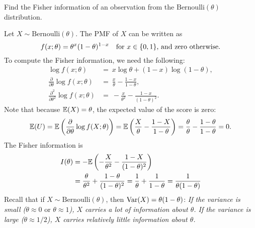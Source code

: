 \begin{example}
Find the Fisher information of an observation from the $\text{Bernoulli}(\theta)$ distribution.
\begin{solution}
Let $X\sim\text{Bernoulli}(\theta)$. The PMF of $X$ can be written as
\[
f(x;\theta)=\theta^x(1-\theta)^{1-x} \text{\quad for $x\in\{0,1\}$, and zero otherwise.}
\]
To compute the Fisher information, we need the following:
\begin{align*}
\log f(x;\theta)
	& = \ x\log\theta + (1-x)\log(1-\theta), \\[2ex]
\frac{\partial}{\partial\theta}\log f(x;\theta)
	& = \ \frac{x}{\theta} - \frac{1-x}{1-\theta}, \\[2ex]
\frac{\partial^2}{\partial\theta^2} \log f(x;\theta)
	& = \ -\frac{x}{\theta^2} - \frac{1-x}{(1-\theta)^2}.
\end{align*}
Note that because $\mathbb{E}(X)=\theta$, the expected value of the score is zero:
\[
\mathbb{E}(U) = \mathbb{E}\left(\frac{\partial}{\partial\theta}\log f(X;\theta)\right) 
	= \mathbb{E}\left(\frac{X}{\theta} - \frac{1-X}{1-\theta}\right)
	= \frac{\theta}{\theta} - \frac{1-\theta}{1-\theta}
	= 0.
\]
The Fisher information is 
\begin{align*}
I(\theta)
	& = -\mathbb{E}\left(-\frac{X}{\theta^2}-\frac{1-X}{(1-\theta)^2}\right) \\
	& = \frac{\theta}{\theta^2}+\frac{1-\theta}{(1-\theta)^2}
	= \frac{1}{\theta}+\frac{1}{1-\theta}
	= \frac{1}{\theta(1-\theta)}
\end{align*}
Recall that if $X\sim\text{Bernoulli}(\theta)$, then $\text{Var}(X)=\theta(1-\theta)$:
\bit
\it If the variance is small ($\theta\approx 0 \text{ or } \theta\approx 1$), $X$ carries a lot of information about $\theta$.
\it If the variance is large ($\theta\approx 1/2$), $X$ carries relatively little information about $\theta$.
\eit
\end{solution}
\end{example}


